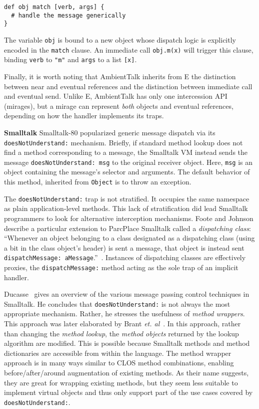 \documentclass{acm_proc_article-sp}
\begin{document}
\begin{lstlisting}
def obj match [verb, args] {
  # handle the message generically
}
\end{lstlisting}

The variable \texttt{obj} is bound to a new object whose dispatch logic is explicitly encoded in the \texttt{match} clause. An immediate call \texttt{obj.m(x)} will trigger this clause, binding \texttt{verb} to \texttt{"m"} and \texttt{args} to a list \texttt{[x]}.

Finally, it is worth noting that AmbientTalk inherits from E the distinction between near and eventual references and the distinction between immediate call and eventual send. Unlike E, AmbientTalk has only one intercession API (mirages), but a mirage can represent \emph{both} objects and eventual references, depending on how the handler implements its traps.

\textbf{Smalltalk} Smalltalk-80 popularized generic message dispatch via its \texttt{doesNotUnderstand:} mechanism. Briefly, if standard method lookup does not find a method corresponding to a message, the Smalltalk VM instead sends the message \texttt{doesNotUnderstand: msg} to the original receiver object. Here, \texttt{msg} is an object containing the message's selector and arguments. The default behavior of this method, inherited from \texttt{Object} is to throw an exception.

The \texttt{doesNotUnderstand:} trap is not stratified. It occupies the same namespace as plain application-level methods. This lack of stratification did lead Smalltalk programmers to look for alternative interception mechanisms. Foote and Johnson describe a particular extension to ParcPlace Smalltalk called a \emph{dispatching class}: ``Whenever an object belonging to a class designated as a dispatching class (using a bit in the class object's header) is sent a message, that object is instead sent \texttt{dispatchMessage: aMessage}.''~\cite{foote_st80}. Instances of dispatching classes are effectively proxies, the \texttt{dispatchMessage:} method acting as the sole trap of an implicit handler.

Ducasse~\cite{ducasse99joop} gives an overview of the various message passing control techniques in Smalltalk. He concludes that \texttt{doesNotUnderstand:} is not always the most appropriate mechanism. Rather, he stresses the usefulness of \emph{method wrappers}. This approach was later elaborated by Brant \emph{et. al}~\cite{brant}. In this approach, rather than changing the \emph{method lookup}, the \emph{method objects} returned by the lookup algorithm are modified. This is possible because Smalltalk methods and method dictionaries are accessible from within the language. The method wrapper approach is in many ways similar to CLOS method combinations, enabling before/after/around augmentation of existing methods. As their name suggests, they are great for wrapping existing methods, but they seem less suitable to implement virtual objects and thus only support part of the use cases covered by \texttt{doesNotUnderstand:}.
\end{document}
